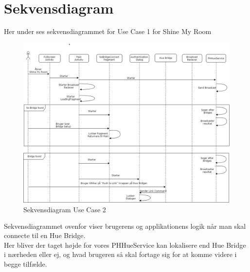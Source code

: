\section{Sekvensdiagram}
Her under ses sekvensdiagrammet for Use Case 1 for Shine My Room
\begin{figure}[H]
	\centering
	\includegraphics[width=1\linewidth, height=0.8\linewidth]{Design/SekvensDiagramUC1}
	\caption{Sekvensdiagram Use Case 2}
	\label{fig:SekvensdiagramUC1}
\end{figure}
Sekvensdiagrammet ovenfor viser brugerens og applikationens logik når man skal connecte til en Hue Bridge. \\
Her bliver der taget højde for vores PHHueService kan lokalisere end Hue Bridge i nærheden eller ej, og hvad brugeren så skal fortage sig for at komme videre i begge tilfælde.
\newpage

